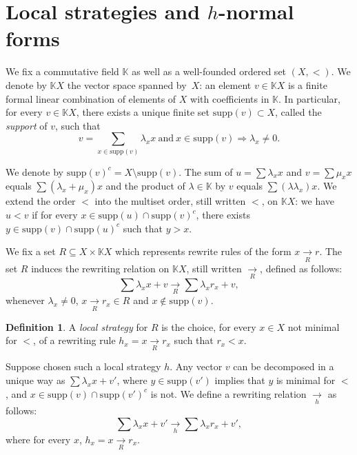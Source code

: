\documentclass[10pt]{easychair}
\theoremstyle{definition}
\newtheorem{definition}[theorem]{Definition}
\newcommand\K{\mathbb{K}}
\newcommand\KX{\K X}
\newcommand\supp{\text{supp}}
\newcommand\rewR{\underset{R}{\longrightarrow}}
\newcommand\rewh{\underset{h}{\longrightarrow}}
\begin{document}
\section{Local strategies and $h$-normal forms}

We fix a commutative field $\K$ as well as a well-founded ordered set
$(X,<)$. We denote by $\KX$ the vector space spanned by~$X$: an element
$v\in\KX$ is a finite formal linear combination of elements of $X$ with
coefficients in $\K$. In particular, for every $v\in\KX$, there exists a
unique finite set $\supp(v)\subset X$, called the \emph{support} of $v$,
such that
\begin{equation}\label{equ:support}
  v=\sum_{x\in\supp(v)}\lambda_xx\ \text{and}\ x\in\supp(v)\Rightarrow\lambda_x
  \neq 0.
\end{equation}

\smallskip
\noindent
We denote by $\supp(v)^c=X\setminus\supp(v)$. The sum of
$u=\sum\lambda_xx$ and $v=\sum\mu_xx$ equals $\sum(\lambda_x+\mu_x)x$ and
the product of $\lambda\in\K$ by $v$ equals $\sum(\lambda\lambda_x)x$. We
extend the order $<$ into the multiset order, still written $<$, on
$\KX$: we have $u<v$ if for every $x\in\supp(u)\cap\supp(v)^c$, there
exists $y\in\supp(v)\cap\supp(u)^c$ such that $y>x$.

\medskip

We fix a set $R\subseteq X\times\KX$ which represents rewrite rules of
the form $x\rewR r$. The set $R$ induces the rewriting relation on $\KX$,
still written $\rewR$, defined as follows:
\begin{equation}\label{equ:rewriting_step}
  \sum\lambda_xx+v\rewR\sum\lambda_xr_x+v,
\end{equation}
whenever $\lambda_x\neq 0$, $x\rewR r_x\in R$ and $x\notin\supp(v)$. 

\begin{definition}
A \emph{local strategy} for $R$ is the choice, for every $x\in X$ not minimal for $<$, of a rewriting rule $h_x=x \rewR r_x$ such that $r_x < x$.
\end{definition}

Suppose chosen such a local strategy $h$. 
Any vector $v$ can be decomposed in a unique way as
$\sum\lambda_xx+v'$, where $y\in\supp(v')$ implies that $y$ is minimal
for $<$, and $x\in\supp(v)\cap\supp(v')^c$ is not. We define a rewriting
relation $\rewh$ as follows:
\begin{equation}\label{equ:well-formed_rewriting_step}
  \sum\lambda_xx+v'\rewh\sum\lambda_xr_x+v',
\end{equation}
where for every $x$, $h_x=x \rewR r_x$.
\end{document}
